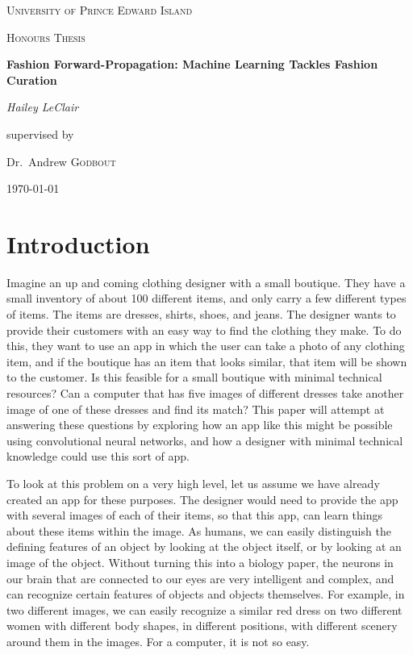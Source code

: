 \documentclass[12pt]{report} %
\begin{document}
\begin{titlepage}
\centering
    {\scshape\LARGE University of Prince Edward Island\par}
    \vspace{1cm}
    {\scshape\Large Honours Thesis\par}
    \vspace{1.5cm}
    {\huge\bfseries Fashion Forward-Propagation: Machine Learning Tackles Fashion Curation\par}
    \vspace{2cm}
    {\Large\itshape Hailey LeClair\par}
    \vfill
    supervised by\par
    Dr.~Andrew \textsc{Godbout}

\vfill

\today\par

\end{titlepage}
\tableofcontents
\newpage
\listoffigures
\newpage


\chapter{Introduction}
	Imagine an up and coming clothing designer with a small boutique. They have a small inventory of about 100 different items, and only carry a few different types of items. The items are dresses, shirts, shoes, and jeans. The designer wants to provide their customers with an easy way to find the clothing they make. To do this, they want to use an app in which the user can take a photo of any clothing item, and if the boutique has an item that looks similar, that item will be shown to the customer. Is this feasible for a small boutique with minimal technical resources? Can a computer that has five images of different dresses take another image of one of these dresses and find its match? This paper will attempt at answering these questions by exploring how an app like this might be possible using convolutional neural networks, and how a designer with minimal technical knowledge could use this sort of app.
	
	To look at this problem on a very high level, let us assume we have already created an app for these purposes. The designer would need to provide the app with several images of each of their items, so that this app, can learn things about these items within the image. As humans, we can easily distinguish the defining features of an object by looking at the object itself, or by looking at an image of the object. Without turning this into a biology paper, the neurons in our brain that are connected to our eyes are very intelligent and complex, and can recognize certain features of objects and objects themselves\cite{aurelienMachineLearning}. For example, in two different images, we can easily recognize a similar red dress on two different women with different body shapes, in different positions, with different scenery around them in the images. For a computer, it is not so easy. 
	
\end{document}
